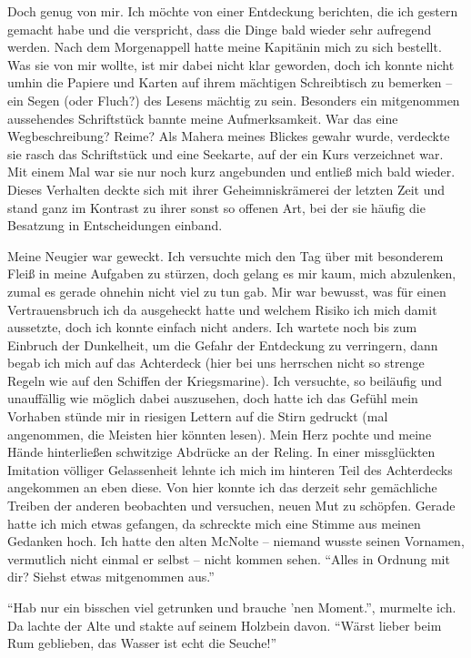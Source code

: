 \vspace{0.5cm}\noindent
Doch genug von mir. Ich möchte von einer Entdeckung berichten, die ich gestern gemacht habe und die verspricht, dass die Dinge bald wieder sehr aufregend werden. Nach dem Morgenappell hatte meine Kapitänin mich zu sich bestellt. Was sie von mir wollte, ist mir dabei nicht klar geworden, doch ich konnte nicht umhin die Papiere und Karten auf ihrem mächtigen Schreibtisch zu bemerken -- ein Segen (oder Fluch?) des Lesens mächtig zu sein. Besonders ein mitgenommen aussehendes Schriftstück bannte meine Aufmerksamkeit. War das eine Wegbeschreibung? Reime? Als Mahera meines Blickes gewahr wurde, verdeckte sie rasch das Schriftstück und eine Seekarte, auf der ein Kurs verzeichnet war. Mit einem Mal war sie nur noch kurz angebunden und entließ mich bald wieder. Dieses Verhalten deckte sich mit ihrer Geheimniskrämerei der letzten Zeit und stand ganz im Kontrast zu ihrer sonst so offenen Art, bei der sie häufig die Besatzung in Entscheidungen einband.

Meine Neugier war geweckt. Ich versuchte mich den Tag über mit besonderem Fleiß in meine Aufgaben zu stürzen, doch gelang es mir kaum, mich abzulenken, zumal es gerade ohnehin nicht viel zu tun gab. Mir war bewusst, was für einen Vertrauensbruch ich da ausgeheckt hatte und welchem Risiko ich mich damit aussetzte, doch ich konnte einfach nicht anders. Ich wartete noch bis zum Einbruch der Dunkelheit, um die Gefahr der Entdeckung zu verringern, dann begab ich mich auf das Achterdeck (hier bei uns herrschen nicht so strenge Regeln wie auf den Schiffen der Kriegsmarine). Ich versuchte, so beiläufig und unauffällig wie möglich dabei auszusehen, doch hatte ich das Gefühl mein Vorhaben stünde mir in riesigen Lettern auf die Stirn gedruckt (mal angenommen, die Meisten hier könnten lesen). Mein Herz pochte und meine Hände hinterließen schwitzige Abdrücke an der Reling. In einer missglückten Imitation völliger Gelassenheit lehnte ich mich im hinteren Teil des Achterdecks angekommen an eben diese. Von hier konnte ich das derzeit sehr gemächliche Treiben der anderen beobachten und versuchen, neuen Mut zu schöpfen. Gerade hatte ich mich etwas gefangen, da schreckte mich eine Stimme aus meinen Gedanken hoch. Ich hatte den alten McNolte -- niemand wusste seinen Vornamen, vermutlich nicht einmal er selbst -- nicht kommen sehen. \enquote{Alles in Ordnung mit dir? Siehst etwas mitgenommen aus.}

\enquote{Hab nur ein bisschen viel getrunken und brauche 'nen Moment.}, murmelte ich. Da lachte der Alte und stakte auf seinem Holzbein davon. \enquote{Wärst lieber beim Rum geblieben, das Wasser ist echt die Seuche!}

